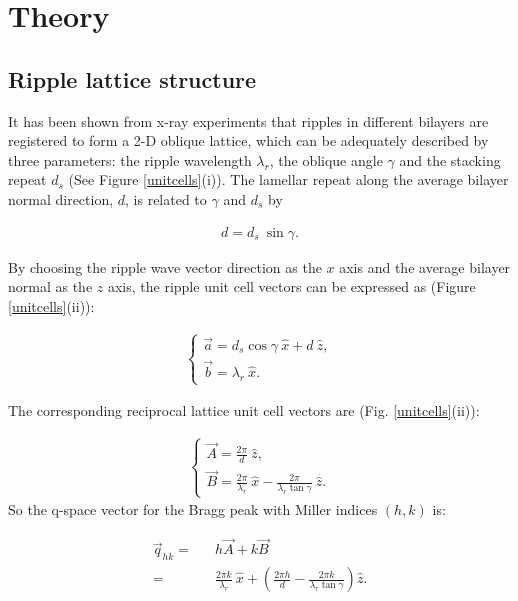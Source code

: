 \section{Theory}
\subsection{Ripple lattice structure}

It has been shown from x-ray experiments \cite{Tar73,JanSS79,Ino80,Ale85,%
Wac89a,Kat95} that ripples in different bilayers are registered to form a 
2-D oblique lattice, which can be adequately described by three parameters: 
the ripple wavelength $\lambda_r$, the oblique angle $\gamma$ and the stacking
repeat $d_s$ (See Figure \ref{unitcells}(i)). The lamellar repeat along 
the average bilayer
normal direction, $d$, is related to $\gamma$ and $d_s$ by

\begin{eqnarray}
\label{dspace}
d = d_s\ \sin \gamma.
\end{eqnarray}

By choosing the ripple wave vector direction as the $x$ axis and the average
bilayer normal as the $z$ axis, the ripple unit cell vectors can be 
expressed as (Figure \ref{unitcells}(ii)):

\begin{eqnarray}
\label{realunit}
\left\{ \begin{array}{ll}
\vec{a} = d_s \cos \gamma\ \hat{x} + d\ \hat{z},\\
\vec{b} = \lambda_r\ \hat{x}.
\end{array}
\right.
\end{eqnarray}

The corresponding reciprocal lattice unit cell vectors are 
(Fig. \ref{unitcells}(ii)):

\begin{eqnarray}
\label{reciunit}
\left\{ \begin{array}{ll}
\vec{A} = \frac{2 \pi}{d}\ \hat{z},\\
\vec{B} = \frac{2 \pi}{\lambda_r}\ \hat{x} - \frac{2 \pi}{\lambda_r 
\tan \gamma}\ \hat{z}.
\end{array}
\right.
\end{eqnarray}
So the q-space vector for the Bragg peak with Miller indices $(h,k)$
is:

\begin{eqnarray}
\label{qvector}
\vec{q}_{hk} =&& h \vec{A} + k \vec{B} \nonumber\\
=&& \frac{2 \pi k}{\lambda_r}\ \hat{x} + \left( \frac{2 \pi h}{d} -
\frac{2 \pi k}{\lambda_r \tan \gamma} \right) \hat{z}.
\end{eqnarray}

